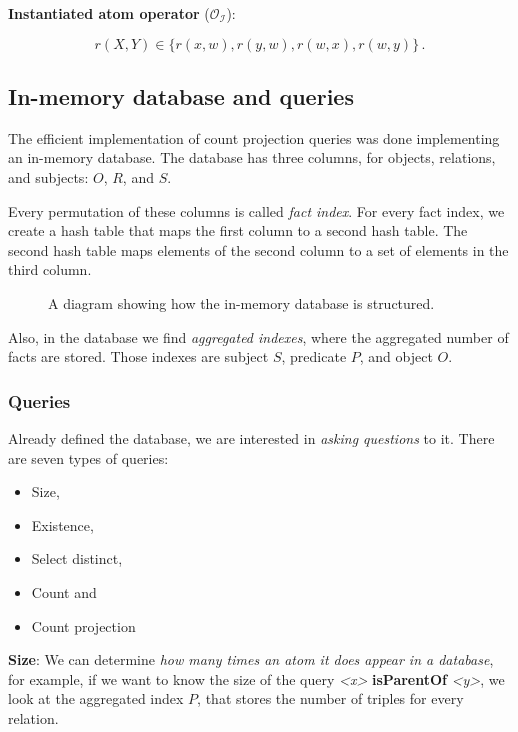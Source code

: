 \documentclass{article}
\newcommand{\triple}[3]{{\itshape\textless#1\textgreater} {\bfseries#2} {\itshape\textless#3\textgreater}}
\begin{document}
\noindent \textbf{Instantiated atom operator} ($\mathcal{O}_\mathcal{I}$):

\begin{equation}
    r(X, Y) \in \{ r(x, w), r(y, w), r(w, x), r(w, y) \}\,.
\end{equation}

\subsection{In-memory database and queries}
\label{ssec:in_memory_database}

The efficient implementation of count projection queries was done implementing
an in-memory database. The database has three columns, for objects, relations,
and subjects: $O$, $R$, and $S$.

Every permutation of these columns is called \textit{fact index}. For every
fact index, we create a hash table that maps the first column to a second hash
table. The second hash table maps elements of the second column to a set of
elements in the third column.

\begin{figure}[H]
\centering
    
\caption{A diagram showing how the in-memory database is structured.}
\label{fig:db}
\end{figure}

Also, in the database we find \textit{aggregated indexes}, where the aggregated
number of facts are stored. Those indexes are subject $S$, predicate $P$, and object $O$.

\subsubsection{Queries}
\label{sssec:queries}

Already defined the database, we are interested in \textit{asking questions} to
it. There are seven types of queries:

\begin{itemize}
    \item Size,
    \item Existence,
    \item Select distinct,
    \item Count and
    \item Count projection
\end{itemize}

\noindent \textbf{Size}: We can determine \textit{how many times an
atom it does appear in a database}, for example, if we want to know the size of
the query \triple{x}{isParentOf}{y}, we look at the aggregated index $P$, that
stores the number of triples for every relation.
\end{document}
